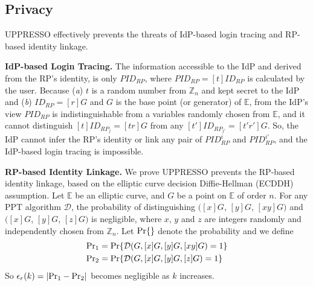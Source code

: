 


\subsection{Privacy}
UPPRESSO effectively prevents the threats of IdP-based login tracing and RP-based identity linkage.

\vspace{0.5mm}
\noindent\textbf{IdP-based Login Tracing.}
The information accessible to the IdP and derived from the RP's identity,
    is only $PID_{RP}$, where $PID_{RP} = [t]ID_{RP}$ is calculated by the user.
Because  (\emph{a}) $t$ is a random number from $\mathbb{Z}_n$ and kept secret to the IdP
 and (\emph{b}) $ID_{RP} = [r]G$ and $G$ is the base point (or generator) of $\mathbb{E}$,
from the IdP's view
$PID_{RP}$ 
is indistinguishable from a variables randomly chosen from $\mathbb{E}$,
    and it cannot distinguish $[t]ID_{RP_j} = [tr]G$ from any $[t']ID_{RP_{j'}} = [t'r']G$.
So, the IdP cannot infer the RP's identity or link any pair of $PID_{RP}^i$ and $PID_{RP}^{i'}$,
    and the IdP-based login tracing is impossible.

\vspace{0.5mm}
\noindent\textbf{RP-based Identity Linkage.}
We prove UPPRESSO prevents the RP-based identity linkage,
 based on the elliptic curve decision Diffie-Hellman (ECDDH) assumption. %
%
Let $\mathbb{E}$ be an elliptic curve,
    and $G$ be a point on $\mathbb{E}$ of order $n$.
For any PPT algorithm $\mathcal{D}$, the probability of distinguishing
 $([x]G$, $[y]G$, $[xy]G)$ and $([x]G$, $[y]G$, $[z]G)$
is negligible,
 where $x$, $y$ and $z$ are integers randomly and independently chosen from $\mathbb{Z}_n$.
Let  ${\rm Pr}\{\}$ denote the probability and
 we define
\begin{align*}
&{\rm Pr}_1 =  {\rm Pr}\{\mathcal{D}(G, [x]G, [y]G, [xy]G)=1\} \\
&{\rm Pr}_2 =  {\rm Pr}\{\mathcal{D}(G, [x]G, [y]G, [z]G)=1\}
\end{align*}
So $\epsilon_{r}(k) = |{\rm Pr}_1 - {\rm Pr}_2|$ becomes negligible as $k$ increases.


